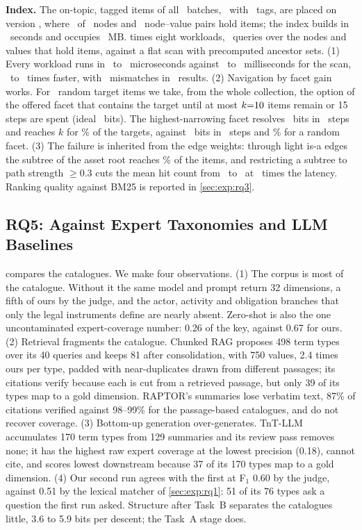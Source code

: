 \textbf{Index.} The on-topic, tagged items of all \RIterWord\ batches,
\RItems\ with \RTags\ tags, are placed on version \RCat, where \RNodesTagged\
of \RNodes\ nodes and \RPairs\ node--value pairs hold items; the index builds in \RBuildSec\
seconds and occupies \RIndexMB~MB.  times eight workloads,
\RQueries\ queries over the nodes and values that hold items, against a flat
scan with precomputed ancestor sets.
(1) Every workload runs in \RLatMin\ to \RLatMax\ microseconds against
\RFlatMinMs\ to \RFlatMaxMs\ milliseconds for the scan, \RSpeedMin\ to
\RSpeedMax\ times faster, with \RMismatches\ mismatches in \RQueries\ results.
(2) Navigation by facet gain works. For \RTargets\ random target items we
take, from the whole collection, the option of the offered facet that contains
the target until at most $k{=}10$ items remain or 15 steps are spent (ideal
\RIdealBits\ bits). The highest-narrowing facet resolves \RGainBits\ bits in
\RGainSteps\ steps and reaches $k$ for \RGainReached\% of the targets, against
\RRandBits\ bits in \RRandSteps\ steps and \RRandReached\% for a random facet. (3) The failure is
inherited from the edge weights: through light is-a edges the subtree of the
asset root reaches \RTopClosurePct\% of the items, and restricting a subtree to path
strength $\ge 0.3$ cuts the mean hit count from \RClosureHits\ to
\RStrengthHits\ at \RStrengthLatRatio\ times the latency.
Ranking quality against BM25 is reported in \cref{sec:exp:rq3}.

\subsection{RQ5: Against Expert Taxonomies and LLM Baselines}
\label{sec:exp:rq5}

 compares the catalogues. We make four observations. (1) The
corpus is most of the catalogue. Without it the same model and prompt return
32 dimensions, a fifth of ours by the judge, and the actor, activity and
obligation branches that only the legal instruments define are nearly
absent. Zero-shot is also the one uncontaminated expert-coverage number:
0.26 of the key, against 0.67 for ours. (2) Retrieval fragments the
catalogue. Chunked RAG proposes 498 term types over its 40 queries and keeps
81 after consolidation, with 750 values, 2.4 times ours per type, padded with
near-duplicates drawn from different passages; its citations verify because
each is cut from a retrieved passage, but only 39 of its types map to a gold
dimension. RAPTOR's summaries lose verbatim text, 87\% of citations verified
against 98--99\% for the passage-based catalogues, and do not recover
coverage. (3) Bottom-up generation over-generates. TnT-LLM accumulates 170
term types from 129 summaries and its review pass removes none; it has the
highest raw expert coverage at the lowest precision (0.18), cannot cite, and
scores lowest downstream because 37 of its 170 types map to a gold dimension.
(4) Our second run agrees with the first at F$_1$ 0.60 by the judge, against
0.51 by the lexical matcher of \cref{sec:exp:rq1}: 51 of its 76 types ask a
question the first run asked. Structure after Task~B separates the catalogues
little, 3.6 to 5.9 bits per descent; the Task~A stage does.

